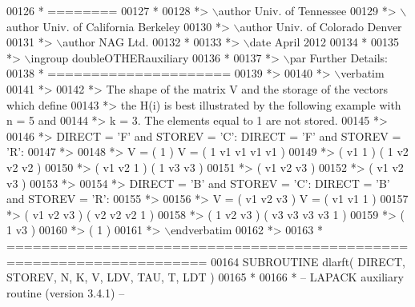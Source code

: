 \begin{DoxyCode}
00126 \textcolor{comment}{*  ========}
00127 \textcolor{comment}{*}
00128 \textcolor{comment}{*> \(\backslash\)author Univ. of Tennessee }
00129 \textcolor{comment}{*> \(\backslash\)author Univ. of California Berkeley }
00130 \textcolor{comment}{*> \(\backslash\)author Univ. of Colorado Denver }
00131 \textcolor{comment}{*> \(\backslash\)author NAG Ltd. }
00132 \textcolor{comment}{*}
00133 \textcolor{comment}{*> \(\backslash\)date April 2012}
00134 \textcolor{comment}{*}
00135 \textcolor{comment}{*> \(\backslash\)ingroup doubleOTHERauxiliary}
00136 \textcolor{comment}{*}
00137 \textcolor{comment}{*> \(\backslash\)par Further Details:}
00138 \textcolor{comment}{*  =====================}
00139 \textcolor{comment}{*>}
00140 \textcolor{comment}{*> \(\backslash\)verbatim}
00141 \textcolor{comment}{*>}
00142 \textcolor{comment}{*>  The shape of the matrix V and the storage of the vectors which define}
00143 \textcolor{comment}{*>  the H(i) is best illustrated by the following example with n = 5 and}
00144 \textcolor{comment}{*>  k = 3. The elements equal to 1 are not stored.}
00145 \textcolor{comment}{*>}
00146 \textcolor{comment}{*>  DIRECT = 'F' and STOREV = 'C':         DIRECT = 'F' and STOREV = 'R':}
00147 \textcolor{comment}{*>}
00148 \textcolor{comment}{*>               V = (  1       )                 V = (  1 v1 v1 v1 v1 )}
00149 \textcolor{comment}{*>                   ( v1  1    )                     (     1 v2 v2 v2 )}
00150 \textcolor{comment}{*>                   ( v1 v2  1 )                     (        1 v3 v3 )}
00151 \textcolor{comment}{*>                   ( v1 v2 v3 )}
00152 \textcolor{comment}{*>                   ( v1 v2 v3 )}
00153 \textcolor{comment}{*>}
00154 \textcolor{comment}{*>  DIRECT = 'B' and STOREV = 'C':         DIRECT = 'B' and STOREV = 'R':}
00155 \textcolor{comment}{*>}
00156 \textcolor{comment}{*>               V = ( v1 v2 v3 )                 V = ( v1 v1  1       )}
00157 \textcolor{comment}{*>                   ( v1 v2 v3 )                     ( v2 v2 v2  1    )}
00158 \textcolor{comment}{*>                   (  1 v2 v3 )                     ( v3 v3 v3 v3  1 )}
00159 \textcolor{comment}{*>                   (     1 v3 )}
00160 \textcolor{comment}{*>                   (        1 )}
00161 \textcolor{comment}{*> \(\backslash\)endverbatim}
00162 \textcolor{comment}{*>}
00163 \textcolor{comment}{*  =====================================================================}
00164 \textcolor{keyword}{      SUBROUTINE }dlarft( DIRECT, STOREV, N, K, V, LDV, TAU, T, LDT )
00165 \textcolor{comment}{*}
00166 \textcolor{comment}{*  -- LAPACK auxiliary routine (version 3.4.1) --}

\end{DoxyCode}
